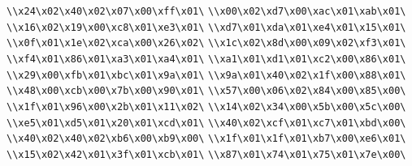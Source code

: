 \verb|\\x24\x02\x40\x02\x07\x00\xff\x01\|\newline
\verb|\\x00\x02\xd7\x00\xac\x01\xab\x01\|\newline
\verb|\\x16\x02\x19\x00\xc8\x01\xe3\x01\|\newline
\verb|\\xd7\x01\xda\x01\xe4\x01\x15\x01\|\newline
\verb|\\x0f\x01\x1e\x02\xca\x00\x26\x02\|\newline
\verb|\\x1c\x02\x8d\x00\x09\x02\xf3\x01\|\newline
\verb|\\xf4\x01\x86\x01\xa3\x01\xa4\x01\|\newline
\verb|\\xa1\x01\xd1\x01\xc2\x00\x86\x01\|\newline
\verb|\\x29\x00\xfb\x01\xbc\x01\x9a\x01\|\newline
\verb|\\x9a\x01\x40\x02\x1f\x00\x88\x01\|\newline
\verb|\\x48\x00\xcb\x00\x7b\x00\x90\x01\|\newline
\verb|\\x57\x00\x06\x02\x84\x00\x85\x00\|\newline
\verb|\\x1f\x01\x96\x00\x2b\x01\x11\x02\|\newline
\verb|\\x14\x02\x34\x00\x5b\x00\x5c\x00\|\newline
\verb|\\xe5\x01\xd5\x01\x20\x01\xcd\x01\|\newline
\verb|\\x40\x02\xcf\x01\xc7\x01\xbd\x00\|\newline
\verb|\\x40\x02\x40\x02\xb6\x00\xb9\x00\|\newline
\verb|\\x1f\x01\x1f\x01\xb7\x00\xe6\x01\|\newline
\verb|\\x15\x02\x42\x01\x3f\x01\xcb\x01\|\newline
\verb|\\x87\x01\x74\x01\x75\x01\x7e\x00\|\newline
